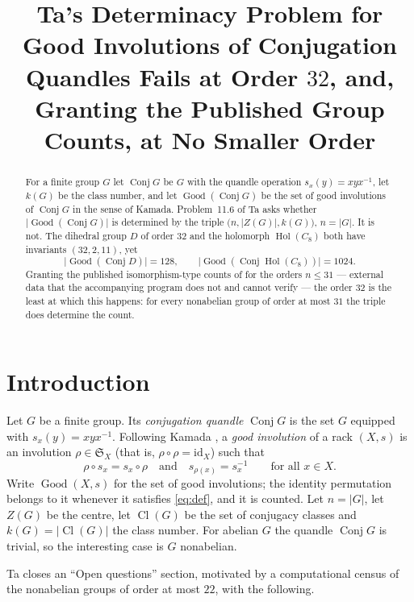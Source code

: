 \documentclass[11pt]{amsart}
\title[Failure at order $32$; least, granting the published counts]
{Ta's Determinacy Problem for Good Involutions of Conjugation Quandles
 Fails at Order $32$, and, Granting the Published Group Counts,
 at No Smaller Order}
\date{}
\theoremstyle{definition}
\newcommand{\Conj}{\operatorname{Conj}}
\newcommand{\Good}{\operatorname{Good}}
\newcommand{\Cl}{\operatorname{Cl}}
\newcommand{\Zc}{Z}
\newcommand{\Hol}{\operatorname{Hol}}
\begin{document}
\begin{abstract}
For a finite group $G$ let $\Conj G$ be $G$ with the quandle operation
$s_x(y)=xyx^{-1}$, let $k(G)$ be the class number, and let $\Good(\Conj G)$ be the set of
good involutions of $\Conj G$ in the sense of Kamada. Problem~11.6 of Ta
\cite{Ta} asks whether $\lvert\Good(\Conj G)\rvert$ is determined by the triple
$\bigl(n,\lvert \Zc(G)\rvert,k(G)\bigr)$, $n=\lvert G\rvert$. It is not. The dihedral
group $D$ of order $32$ and the holomorph $\Hol(C_8)$ both have invariants
$(32,2,11)$, yet
\[
 \lvert\Good(\Conj D)\rvert=128,
 \qquad
 \lvert\Good(\Conj \Hol(C_8))\rvert=1024 .
\]
Granting the published isomorphism-type counts of \cite{A000001} for the orders $n\le 31$ ---
external data that the accompanying program does not and cannot verify --- the order $32$ is
the least at which this happens: for every nonabelian group of order at most $31$ the triple
does determine the count.
\end{abstract}

\maketitle

\section{Introduction}

Let $G$ be a finite group. Its \emph{conjugation quandle} $\Conj G$ is the set $G$ equipped
with $s_x(y)=xyx^{-1}$. Following Kamada \cite{Kamada}, a \emph{good involution} of a rack
$(X,s)$ is an involution $\rho\in \mathfrak S_X$ (that is, $\rho\circ\rho=\mathrm{id}_X$)
such that
\begin{equation}\label{eq:def}
 \rho\circ s_x=s_x\circ\rho
 \quad\text{and}\quad
 s_{\rho(x)}=s_x^{-1}
 \qquad\text{for all }x\in X .
\end{equation}
Write $\Good(X,s)$ for the set of good involutions; the identity permutation belongs to it
whenever it satisfies \eqref{eq:def}, and it is counted. Let $n=\lvert G\rvert$, let
$\Zc(G)$ be the centre, let $\Cl(G)$ be the set of conjugacy classes and
$k(G)=\lvert\Cl(G)\rvert$ the class number. For abelian $G$ the quandle $\Conj G$ is
trivial, so the interesting case is $G$ nonabelian.

Ta \cite[\S11]{Ta} closes an ``Open questions'' section, motivated by a computational
census of the nonabelian groups of order at most $22$, with the following.
\end{document}
